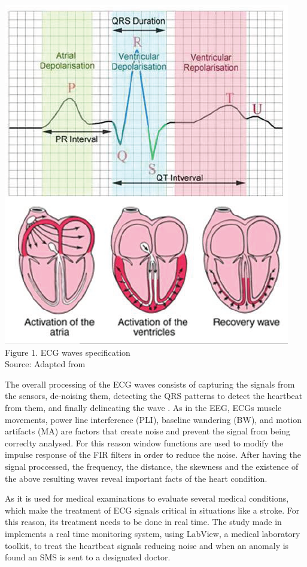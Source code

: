 \begin{center}
\includegraphics[scale=0.5]{images/ECG.png}
\\Figure 1. ECG waves specification
\\Source: Adapted from \cite{ECGEventB}
\end{center}


The overall processing of the ECG waves consists of capturing the signals from the sensors, de-noising them, detecting the QRS patterns to detect the heartbeat from them, and finally delineating the wave \cite{ECGsignalprocc}.
As in the EEG, ECGs muscle movements, power line interference (PLI), baseline wandering (BW), and motion artifacts (MA) are factors that create noise and prevent the signal from being correclty analysed. For this reason window functions are used to modify the impulse response of the FIR filters in order to reduce the noise.  After having the signal proccessed, the frequency, the distance, the skewness and the existence of the above resulting waves reveal important facts of the heart condition.


As it is used for medical examinations to evaluate several medical conditions, which make the treatment of ECG signals critical in situations like a stroke. For this reason, its treatment needs to be done in real time. The study made in \cite{ECGsyc} implements a real time monitoring system, using LabView, a medical laboratory toolkit, to treat the heartbeat signals reducing noise and when an anomaly is found an SMS is sent to a designated doctor.
